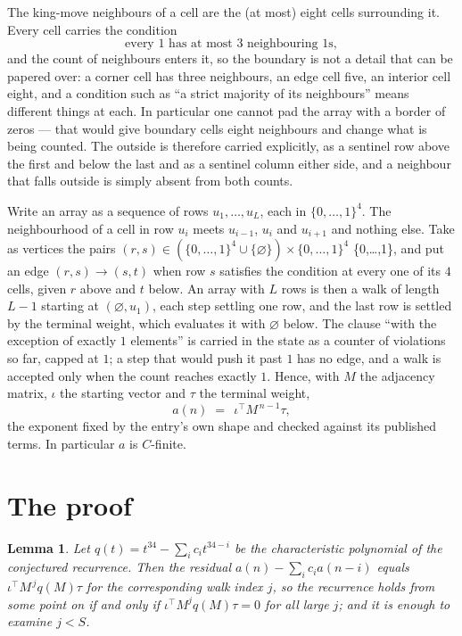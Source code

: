 \documentclass[11pt,a4paper]{article}
\theoremstyle{plain}
\newtheorem{lemma}[theorem]{Lemma}
\theoremstyle{definition}
\begin{document}
The king-move neighbours of a cell are the (at most) eight cells surrounding it. Every cell
carries the condition
\[
\text{every }1\text{ has at most }3\text{ neighbouring }1\text{s},
\]
and the count of neighbours enters it, so the boundary is not a detail that can be papered
over: a corner cell has three neighbours, an edge cell five, an interior cell eight, and a
condition such as ``a strict majority of its neighbours'' means different things at each. In
particular one cannot pad the array with a border of zeros --- that would give boundary cells
eight neighbours and change what is being counted. The outside is therefore carried
explicitly, as a sentinel row above the first and below the last and as a sentinel column
either side, and a neighbour that falls outside is simply absent from both counts.

Write an array as a sequence of rows $u_1,\dots,u_L$, each in
$\{0,\dots,1\}^{4}$. The neighbourhood of a cell in row $u_i$ meets $u_{i-1}$,
$u_i$ and $u_{i+1}$ and nothing else. Take as vertices the pairs
$(r,s)\in(\{0,\dots,1\}^{4}\cup\{\varnothing\})\times\{0,\dots,1\}^{4}$ \times \{0,\dots,1\},
and put an edge $(r,s)\to(s,t)$ when row $s$ satisfies the condition at every one of its
$4$ cells, given $r$ above and $t$ below. An array with $L$ rows is then a walk of length
$L-1$ starting at $(\varnothing,u_1)$, each step settling one row, and the last row is
settled by the terminal weight, which evaluates it with $\varnothing$ below. The clause ``with the exception of exactly $1$ elements'' is carried in
the state as a counter of violations so far, capped at $1$; a step that would push it past
$1$ has no edge, and a walk is accepted only when the count reaches exactly $1$. Hence,
with $M$ the adjacency matrix, $\iota$ the starting vector and $\tau$ the terminal weight,
\[
a(n)\;=\;\,\iota^{\!\top}M^{\,n-1}\tau ,
\]
the exponent fixed by the entry's own shape and checked against its published terms. In
particular $a$ is $C$-finite.

\section{The proof}

\begin{lemma}\label{lem:crit}
Let $q(t)=t^{34}-\sum_i c_it^{34-i}$ be the characteristic polynomial of the
conjectured recurrence. Then the residual $a(n)-\sum_ic_ia(n-i)$ equals
$\iota^{\!\top}M^{\,j}q(M)\tau$ for the corresponding walk index $j$, so the
recurrence holds from some point on if and only if $\iota^{\!\top}M^{j}q(M)\tau=0$ for all
large $j$; and it is enough to examine $j<S$.
\end{lemma}
\end{document}
